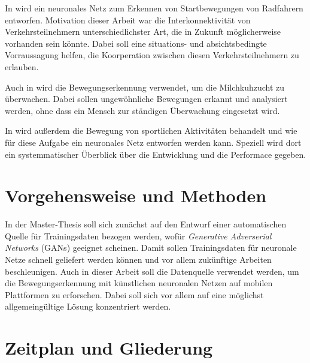 \documentclass[dvipsnames,a4paper,12pt]{article}
\begin{document}
  In \cite{Bieshaar2018} wird ein neuronales Netz zum Erkennen von Startbewegungen
  von Radfahrern entworfen. Motivation dieser Arbeit war die Interkonnektivität von
  Verkehrsteilnehmern unterschiedlichster Art, die in Zukunft mög\-lich\-er\-wei\-se vorhanden
  sein könnte. Dabei soll eine situations- und absichtsbedingte Vorraussagung helfen,
  die Koorperation zwischen diesen Verkehrsteilnehmern zu erlauben.

  Auch in \cite{Gao2016} wird die Bewegungserkennung verwendet, um die Milchkuhzucht
  zu über\-wa\-chen. Dabei sollen ungewöhnliche Bewegungen erkannt und analysiert werden,
  ohne dass ein Mensch zur ständigen Überwachung eingesetzt wird.

  In \cite{Cust2019} wird außerdem die Bewegung von sportlichen Aktivitäten behandelt
  und wie für diese Aufgabe ein neuronales Netz entworfen werden kann. Speziell wird
  dort ein systemmatischer Überblick über die Entwicklung und die Performace gegeben.

  \section{Vorgehensweise und Methoden} %
  In der Master-Thesis soll sich zunächst auf den Entwurf einer automatischen Quelle
  für Trainingsdaten bezogen werden, wofür \textit{Generative Adverserial Networks}
  (GANs) geeignet scheinen. Damit sollen Trainingsdaten für neuronale Netze schnell
  geliefert werden können und vor allem zukünftige Arbeiten beschleunigen. Auch in
  dieser Arbeit soll die Datenquelle verwendet werden, um die Bewegungserkennung
  mit künstlichen neuronalen Netzen auf mobilen Plattformen zu erforschen. Dabei soll
  sich vor allem auf eine möglichst allgemeingültige Lösung konzentriert werden.

  \section{Zeitplan und Gliederung} %
\end{document}
